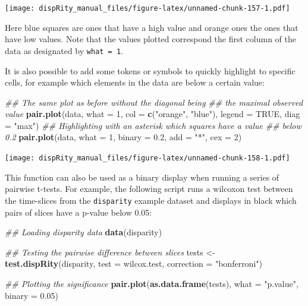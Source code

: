 \documentclass[
]{book}
\newenvironment{Shaded}{\begin{snugshade}}{\end{snugshade}}
\newcommand{\CommentTok}[1]{\textcolor[rgb]{0.56,0.35,0.01}{\textit{#1}}}
\newcommand{\DataTypeTok}[1]{\textcolor[rgb]{0.13,0.29,0.53}{#1}}
\newcommand{\DecValTok}[1]{\textcolor[rgb]{0.00,0.00,0.81}{#1}}
\newcommand{\FloatTok}[1]{\textcolor[rgb]{0.00,0.00,0.81}{#1}}
\newcommand{\KeywordTok}[1]{\textcolor[rgb]{0.13,0.29,0.53}{\textbf{#1}}}
\newcommand{\NormalTok}[1]{#1}
\newcommand{\OtherTok}[1]{\textcolor[rgb]{0.56,0.35,0.01}{#1}}
\newcommand{\StringTok}[1]{\textcolor[rgb]{0.31,0.60,0.02}{#1}}
\begin{document}
\texttt{[image: dispRity\_manual\_files/figure-latex/unnamed-chunk-157-1.pdf]}

Here blue squares are ones that have a high value and orange ones the ones that have low values.
Note that the values plotted correspond the first column of the data as designated by \texttt{what\ =\ 1}.

It is also possible to add some tokens or symbols to quickly highlight to specific cells, for example which elements in the data are below a certain value:

\begin{Shaded}
\begin{Highlighting}[]
\CommentTok{\#\# The same plot as before without the diagonal being}
\CommentTok{\#\# the maximal observed value}
\KeywordTok{pair.plot}\NormalTok{(data, }\DataTypeTok{what =} \DecValTok{1}\NormalTok{, }\DataTypeTok{col =} \KeywordTok{c}\NormalTok{(}\StringTok{"orange"}\NormalTok{, }\StringTok{"blue"}\NormalTok{), }\DataTypeTok{legend =} \OtherTok{TRUE}\NormalTok{,}
          \DataTypeTok{diag =} \StringTok{"max"}\NormalTok{)}
\CommentTok{\#\# Highlighting with an asterisk which squares have a value}
\CommentTok{\#\# below 0.2}
\KeywordTok{pair.plot}\NormalTok{(data, }\DataTypeTok{what =} \DecValTok{1}\NormalTok{, }\DataTypeTok{binary =} \FloatTok{0.2}\NormalTok{, }\DataTypeTok{add =} \StringTok{"*"}\NormalTok{, }\DataTypeTok{cex =} \DecValTok{2}\NormalTok{)}
\end{Highlighting}
\end{Shaded}

\texttt{[image: dispRity\_manual\_files/figure-latex/unnamed-chunk-158-1.pdf]}

This function can also be used as a binary display when running a series of pairwise t-tests.
For example, the following script runs a wilcoxon test between the time-slices from the \texttt{disparity} example dataset and displays in black which pairs of slices have a p-value below 0.05:

\begin{Shaded}
\begin{Highlighting}[]
\CommentTok{\#\# Loading disparity data}
\KeywordTok{data}\NormalTok{(disparity)}

\CommentTok{\#\# Testing the pairwise difference between slices}
\NormalTok{tests \textless{}{-}}\StringTok{ }\KeywordTok{test.dispRity}\NormalTok{(disparity, }\DataTypeTok{test =}\NormalTok{ wilcox.test, }\DataTypeTok{correction =} \StringTok{"bonferroni"}\NormalTok{)}

\CommentTok{\#\# Plotting the significance}
\KeywordTok{pair.plot}\NormalTok{(}\KeywordTok{as.data.frame}\NormalTok{(tests), }\DataTypeTok{what =} \StringTok{"p.value"}\NormalTok{, }\DataTypeTok{binary =} \FloatTok{0.05}\NormalTok{)}
\end{Highlighting}
\end{Shaded}
\end{document}
